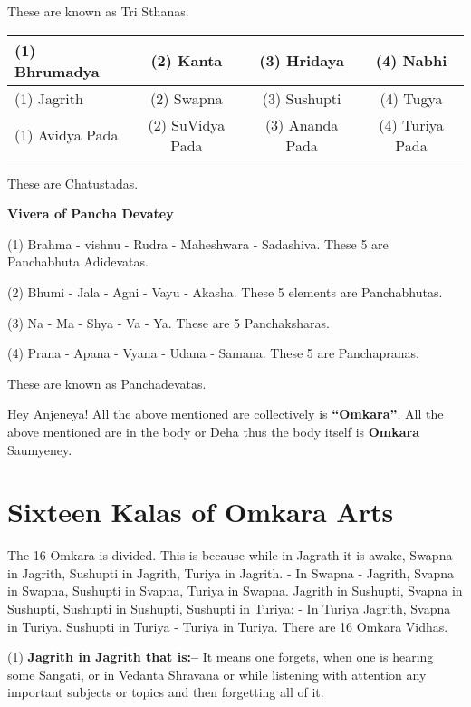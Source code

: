 These are known as Tri Sthanas.

\begin{table}[H]
\caption{\textbf{Chatustada Vivara}}
\begin{longtable}{@{}|l|c|c|c|@{}}
\hline
(1) Bhrumadya & (2) Kanta & (3) Hridaya & (4) Nabhi \\
\hline
(1) Jagrith & (2) Swapna & (3) Sushupti & (4) Tugya \\
\hline
(1) Avidya Pada & (2) SuVidya Pada & (3) Ananda Pada & (4) Turiya Pada \\
\hline
\end{longtable}
\end{table}

These are Chatustadas.

\begin{center}
\textbf{Vivera of Pancha Devatey}
\end{center}

(1) Brahma - vishnu - Rudra - Maheshwara - Sadashiva. These 5 are Panchabhuta Adidevatas.

(2) Bhumi - Jala - Agni - Vayu - Akasha. These 5 elements are Panchabhutas.

(3) Na - Ma - Shya - Va - Ya. These are 5 Panchaksharas.

(4) Prana - Apana - Vyana - Udana - Samana. These 5 are Panchapranas.

These are known as Panchadevatas.

Hey Anjeneya! All the above mentioned are collectively is \textbf{“Omkara”}. All the above mentioned are in the body or Deha thus the body itself is \textbf{Omkara} Saumyeney.

\chapter{Sixteen Kalas of Omkara Arts}

The 16 Omkara is divided. This is because while in Jagrath it is awake, Swapna in Jagrith, Sushupti in Jagrith, Turiya in Jagrith. - In Swapna - Jagrith, Svapna in Swapna, Sushupti in Svapna, Turiya in Swapna. Jagrith in Sushupti, Svapna in Sushupti, Sushupti in Sushupti, Sushupti in Turiya: - In Turiya Jagrith, Svapna in Turiya. Sushupti in Turiya - Turiya in Turiya. There are 16 Omkara Vidhas.

\vskip 9pt

(1) \textbf{Jagrith in Jagrith that is:–} It means one forgets, when one is hearing some Sangati, or in Vedanta Shravana or while listening with attention any important subjects or topics and then forgetting all of it.

